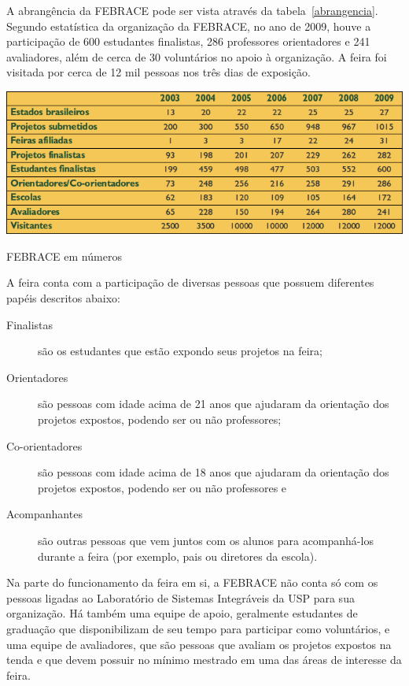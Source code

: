 A abrangência da FEBRACE pode ser vista através da tabela~\ref{abrangencia}. Segundo estatística da organização da FEBRACE, no ano de 2009, houve a participação de 600 estudantes finalistas, 286 professores orientadores e 241 avaliadores, além de cerca de 30 voluntários no apoio à organização. A feira foi visitada por cerca de 12 mil pessoas nos três dias de exposição. 

\begin{table}[h]
    \begin{center}
        \includegraphics[width=0.8\linewidth]{arquivos/abrangencia.png}
    \end{center}
    \caption{FEBRACE em números}
    \label{abrangencia}
\end{table}

A feira conta com a participação de diversas pessoas que possuem diferentes papéis descritos abaixo:

\begin{description}
    \item[Finalistas] 
        são os estudantes que estão expondo seus projetos na feira;
    \item[Orientadores] 
        são pessoas com idade acima de 21 anos que ajudaram da orientação dos projetos expostos, podendo ser ou não professores;
    \item[Co-orientadores] 
        são pessoas com idade acima de 18 anos que ajudaram da orientação dos projetos expostos, podendo ser ou não professores e
    \item[Acompanhantes] 
        são outras pessoas que vem juntos com os alunos para acompanhá-los durante a feira (por exemplo, pais ou diretores da escola).
\end{description}

Na parte do funcionamento da feira em si, a FEBRACE não conta só com os pessoas ligadas ao Laboratório de Sistemas Integráveis da USP para sua organização. Há também uma equipe de apoio, geralmente estudantes de graduação que disponibilizam de seu tempo para participar como voluntários, e uma equipe de avaliadores, que são pessoas que avaliam os projetos expostos na tenda e que devem possuir no mínimo mestrado em uma das áreas de interesse da feira.

